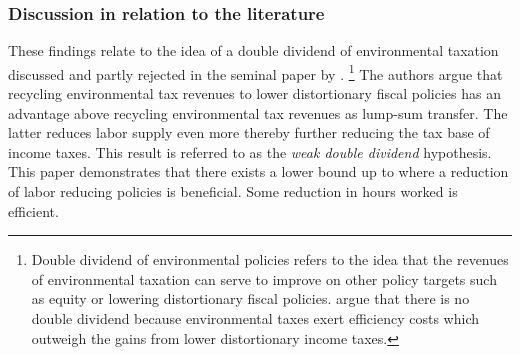 \begin{comment}
\begin{prop}
Effect of using progressive income scheme on inequality (maybe as opposed to lump-sum transfers)
\end{prop}

content...
\end{comment}

\subsubsection{Discussion in relation to the literature}
These findings relate to the idea of a double dividend of environmental taxation discussed and partly rejected in the seminal paper by \cite{LansBovenberg1994EnvironmentalTaxation}.
\footnote{  Double dividend of environmental policies refers to the idea that the revenues of environmental taxation can serve to improve on other policy targets such as equity or lowering distortionary fiscal policies. \cite{LansBovenberg1994EnvironmentalTaxation} argue that there is no double dividend because environmental taxes exert efficiency costs which outweigh the gains from lower distortionary income taxes.} The authors argue that recycling environmental tax revenues to lower distortionary fiscal policies has an advantage above recycling environmental tax revenues as lump-sum transfer. The latter reduces labor supply even more thereby further reducing the tax base of income taxes.  This result is referred to as the \textit{weak double dividend} hypothesis. This paper demonstrates that there exists a lower bound up to where a reduction of labor reducing policies is beneficial.
Some reduction in hours worked is efficient.  

